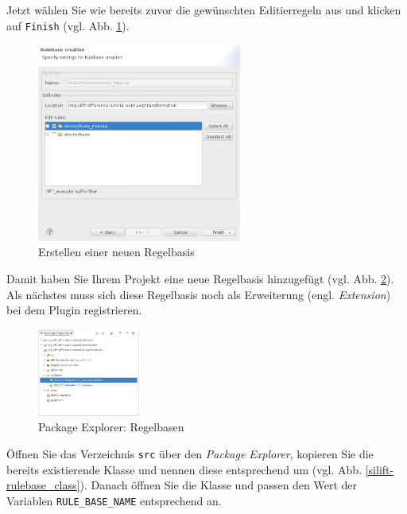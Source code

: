 Jetzt wählen Sie wie bereits zuvor die gewünschten Editierregeln aus und klicken auf \texttt{Finish} (vgl. Abb. \ref{silift-wizard_rulebase_file_page03}).

\begin{figure}[H]
\centering
\includegraphics[width=0.6\textwidth]{recognitionrules/graphics/silift-wizard_rulebase_file_page03.png}
\caption{Erstellen einer neuen Regelbasis}
\label{silift-wizard_rulebase_file_page03}
\end{figure}

Damit haben Sie Ihrem Projekt eine neue Regelbasis hinzugefügt (vgl. Abb. \ref{silift-rulebase_package_explorer}).
Als nächstes muss sich diese Regelbasis noch als Erweiterung (engl. \textit{Extension}) bei dem Plugin registrieren.


\begin{figure}[H]
\centering
\includegraphics[width=0.3\textwidth]{recognitionrules/graphics/silift-rulebase_package_explorer.png}
\caption{Package Explorer: Regelbasen}
\label{silift-rulebase_package_explorer}
\end{figure}

Öffnen Sie das Verzeichnis \texttt{src} über den \textit{Package Explorer}, kopieren Sie die bereits existierende Klasse und nennen diese entsprechend um (vgl. Abb. \ref{silift-rulebase_class}).
Danach öffnen Sie die Klasse und passen den Wert der Variablen \texttt{RULE\_BASE\_NAME} entsprechend an. 

